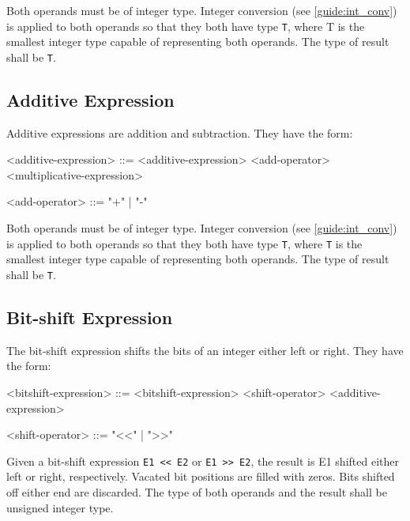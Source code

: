 Both operands must be of integer type. Integer conversion (see \ref{guide:int_conv}) is applied to both operands so that they both have type \texttt{T}, where T is the smallest integer type capable of representing both operands. The type of result shall be \texttt{T}. 

\subsection{Additive Expression} \label{guide:add_expr}

Additive expressions are addition and subtraction. They have the form: 

\begin{minip}
\begin{grammar}
<additive-expression> ::= <additive-expression> 
<add-operator> <multiplicative-expression>

<add-operator> ::= "+" | "-"
\end{grammar}
\end{minip}

Both operands must be of integer type. Integer conversion (see \ref{guide:int_conv}) is applied to both operands so that they both have type \texttt{T}, where \texttt{T} is the smallest integer type capable of representing both operands. The type of result shall be \texttt{T}.

\subsection{Bit-shift Expression} \label{guide:bitshift_expr}

The bit-shift expression shifts the bits of an integer either left or right. They have the form:

\begin{minip}
\begin{grammar}
<bitshift-expression> ::= <bitshift-expression> 
<shift-operator> <additive-expression>

<shift-operator> ::= "<<" | ">>"
\end{grammar}
\end{minip}

Given a bit-shift expression \texttt{E1 << E2} or \texttt{E1 >> E2}, the result is E1 shifted either left or right, respectively. Vacated bit positions are filled with zeros. Bits shifted off either end are discarded. The type of both operands and the result shall be unsigned integer type.

